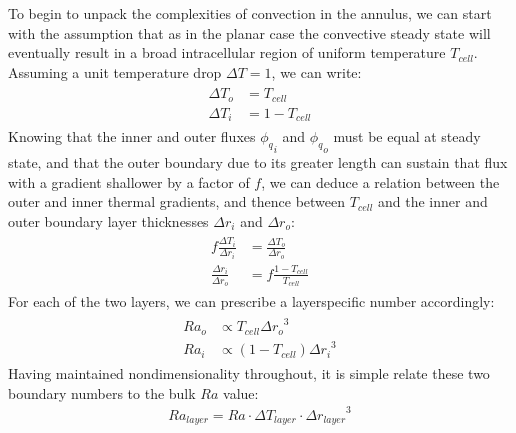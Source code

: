 \documentclass[letterpaper,10pt,english]{jupyterBook}
\begin{document}
\sphinxAtStartPar
To begin to unpack the complexities of convection in the annulus, we can start with the assumption that \sphinxhyphen{} as in the planar case \sphinxhyphen{} the convective steady state will eventually result in a broad intracellular region of uniform temperature \(T_{cell}\). Assuming a unit temperature drop \(\Delta T = 1\), we can write:
\begin{equation*}
\begin{split} \begin{align*}
{\Delta T}_o &= T_{cell} \\
{\Delta T}_i &= 1 - T_{cell}
\end{align*} \end{split}
\end{equation*}
\sphinxAtStartPar
Knowing that the inner and outer fluxes \({\phi_q}_i\) and \({\phi_q}_o\) must be equal at steady state, and that the outer boundary \sphinxhyphen{} due to its greater length \sphinxhyphen{} can sustain that flux with a gradient shallower by a factor of \(f\), we can deduce a relation between the outer and inner thermal gradients, and thence between \(T_{cell}\) and the inner and outer boundary layer thicknesses \({\Delta r}_i\) and \({\Delta r}_o\):
\begin{equation*}
\begin{split} \begin{align*}
f \frac{{\Delta T}_i}{{\Delta r}_i} &= \frac{{\Delta T}_o}{{\Delta r}_o} \\
\frac{{\Delta r}_i}{{\Delta r}_o} &= f \frac{1 - T_{cell}}{T_{cell}}
\end{align*} \end{split}
\end{equation*}
\sphinxAtStartPar
For each of the two layers, we can prescribe a layer\sphinxhyphen{}specific  number accordingly:
\begin{equation*}
\begin{split} \begin{align*}
Ra_o &\propto T_{cell} {{\Delta r}_o}^3 \\
Ra_i &\propto (1 - T_{cell}) {{\Delta r}_i}^3
\end{align*} \end{split}
\end{equation*}
\sphinxAtStartPar
Having maintained non\sphinxhyphen{}dimensionality throughout, it is simple relate these two boundary  numbers to the bulk \(Ra\) value:
\begin{equation*}
\begin{split}
Ra_{layer} = Ra \cdot {\Delta T}_{layer} \cdot {{\Delta r}_{layer}}^3
\end{split}
\end{equation*}
\end{document}
